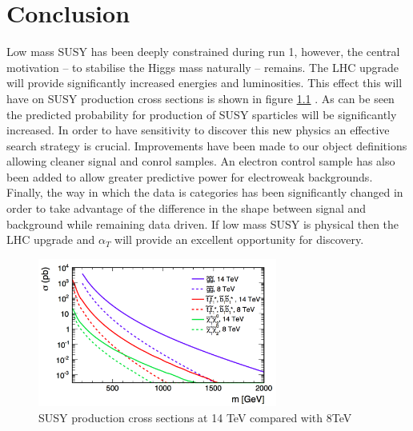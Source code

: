 
\chapter{Conclusion} %

\label{Chapter7} %



Low mass SUSY has been deeply constrained during run 1, however, 
the central motivation -- to stabilise the Higgs mass naturally -- remains. 
The LHC upgrade will provide significantly increased energies and luminosities. 
This effect this will have on SUSY production cross sections is shown 
in figure \ref{snow} \cite{ProjectedCx}. As can be seen the predicted 
probability for production of SUSY sparticles will be significantly 
increased. In order to have sensitivity to discover this new physics 
an effective search strategy is crucial. Improvements have been 
made to our object definitions allowing cleaner signal and conrol
samples. An electron control sample has also been added to allow
greater predictive power for electroweak backgrounds. Finally, the way in which
the data is categories has been significantly changed in order to take
advantage of the difference in the \mht shape between signal and
background while remaining data driven. If low mass SUSY is physical then 
the LHC upgrade and $\alpha_T$ will provide an excellent opportunity for discovery. 

\begin{figure}
\centering
    \includegraphics[width=0.7\textwidth]{Figures/snowmass.png}
  \caption{SUSY production cross sections at 14 TeV compared with 8TeV}
  \label{snow}
\end{figure}


